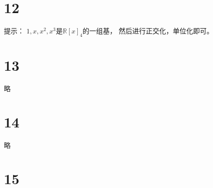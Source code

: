 \documentclass{article}
\begin{document}
\section*{12}

提示：
$1, x, x^2, x^3$是$\mathbb{R}[x]_4$的一组基，
然后进行正交化，单位化即可。

\section*{13}
略

\section*{14}

略

\section*{15}
\end{document}
